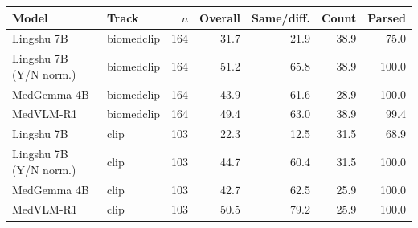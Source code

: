\begin{tabular}{llrrrrr}
\toprule
Model & Track & $n$ & Overall & Same/diff. & Count & Parsed \\
\midrule
Lingshu 7B & biomedclip & 164 & 31.7 & 21.9 & 38.9 & 75.0 \\
Lingshu 7B (Y/N norm.) & biomedclip & 164 & 51.2 & 65.8 & 38.9 & 100.0 \\
MedGemma 4B & biomedclip & 164 & 43.9 & 61.6 & 28.9 & 100.0 \\
MedVLM-R1 & biomedclip & 164 & 49.4 & 63.0 & 38.9 & 99.4 \\
Lingshu 7B & clip & 103 & 22.3 & 12.5 & 31.5 & 68.9 \\
Lingshu 7B (Y/N norm.) & clip & 103 & 44.7 & 60.4 & 31.5 & 100.0 \\
MedGemma 4B & clip & 103 & 42.7 & 62.5 & 25.9 & 100.0 \\
MedVLM-R1 & clip & 103 & 50.5 & 79.2 & 25.9 & 100.0 \\
\bottomrule
\end{tabular}